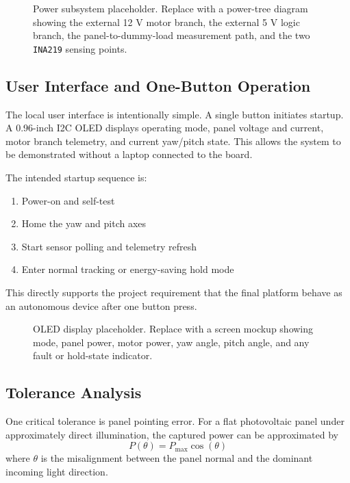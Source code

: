 \documentclass[11pt]{article}
\begin{document}
\begin{figure}[H]
\centering
\fbox{\rule{0pt}{2.0in}\rule{0.86\linewidth}{0pt}}
\caption{Power subsystem placeholder. Replace with a power-tree diagram showing the external 12 V motor branch, the external 5 V logic branch, the panel-to-dummy-load measurement path, and the two \texttt{INA219} sensing points.}
\label{fig:power}
\end{figure}

\subsection{User Interface and One-Button Operation}
The local user interface is intentionally simple. A single button initiates startup. A 0.96-inch I2C OLED displays operating mode, panel voltage and current, motor branch telemetry, and current yaw/pitch state. This allows the system to be demonstrated without a laptop connected to the board.

The intended startup sequence is:
\begin{enumerate}[label=\arabic*.]
\item Power-on and self-test
\item Home the yaw and pitch axes
\item Start sensor polling and telemetry refresh
\item Enter normal tracking or energy-saving hold mode
\end{enumerate}

This directly supports the project requirement that the final platform behave as an autonomous device after one button press.

\begin{figure}[H]
\centering
\fbox{\rule{0pt}{1.8in}\rule{0.75\linewidth}{0pt}}
\caption{OLED display placeholder. Replace with a screen mockup showing mode, panel power, motor power, yaw angle, pitch angle, and any fault or hold-state indicator.}
\label{fig:oled}
\end{figure}

\subsection{Tolerance Analysis}
One critical tolerance is panel pointing error. For a flat photovoltaic panel under approximately direct illumination, the captured power can be approximated by
\begin{equation}
P(\theta) = P_{\max}\cos(\theta)
\end{equation}
where $\theta$ is the misalignment between the panel normal and the dominant incoming light direction.
\end{document}
